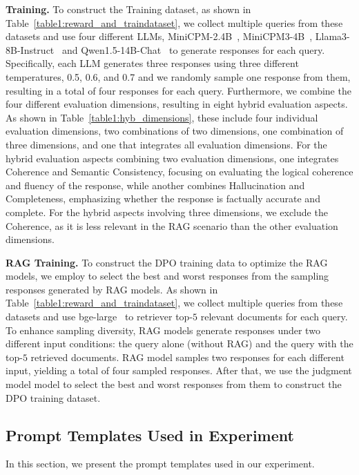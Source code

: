 \textbf{\method{} Training.} To construct the \method{} Training dataset, as shown in Table~\ref{table1:reward_and_traindataset}, we collect multiple queries from these datasets and use four different LLMs, MiniCPM-2.4B~\cite{minicpm-2b2024Hu}, MiniCPM3-4B~\cite{minicpm-2b2024Hu}, Llama3-8B-Instruct~\cite{touvron2023llama} and Qwen1.5-14B-Chat~\cite{qwen2.5-14b2023Bai} to generate responses for each query. Specifically, each LLM generates three responses using three different temperatures, 0.5, 0.6, and 0.7 and we randomly sample one response from them, resulting in a total of four responses for each query. Furthermore, we combine the four different evaluation dimensions, resulting in eight hybrid evaluation aspects. As shown in Table~\ref{table1:hyb_dimensions}, these include four individual evaluation dimensions, two combinations of two dimensions, one combination of three dimensions, and one that integrates all evaluation dimensions. For the hybrid evaluation aspects combining two evaluation dimensions, one integrates Coherence and Semantic Consistency, focusing on evaluating the logical coherence and fluency of the response, while another combines Hallucination and Completeness, emphasizing whether the response is factually accurate and complete. For the hybrid aspects involving three dimensions, we exclude the Coherence, as it is less relevant in the RAG scenario than the other evaluation dimensions.



\textbf{RAG Training.} To construct the DPO training data to optimize the RAG models, we employ \method{} to select the best and worst responses from the sampling responses generated by RAG models. As shown in Table~\ref{table1:reward_and_traindataset}, we collect multiple queries from these datasets and use bge-large~\cite{bge_embedding} to retriever top-$5$ relevant documents for each query. To enhance sampling diversity, RAG models generate responses under two different input conditions: the query alone (without RAG) and the query with the top-$5$ retrieved documents. RAG model samples two responses for each different input, yielding a total of four sampled responses. After that, we use the judgment model model to select the best and worst responses from them to construct the DPO training dataset.








\subsection{Prompt Templates Used in Experiment}
\label{sec:prompt details}
In this section, we present the prompt templates used in our experiment. 

